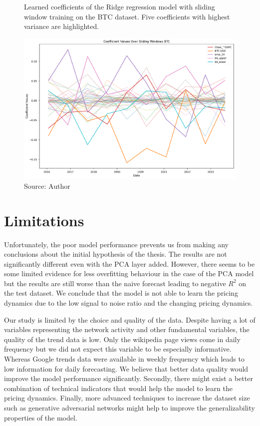 \begin{figure}[!h]
    \centering
    \caption{Learned coefficients of the Ridge regression model
    with sliding window training on the BTC dataset. Five 
    coefficients with highest variance are highlighted.}
    \includegraphics[width=1\textwidth]{Figures/coefficient_values_sliding_btc.pdf}
    \caption*{Source: Author}
    \label{fig:coefs_sliding_btc}
\end{figure}

\section{Limitations}
\label{sec:limitations}
Unfortunately, the poor model performance 
prevents us from making any conclusions about the
initial hypothesis of the thesis. The results 
are not significantly different even with the \ac{PCA}
layer added. However, there seems
to be some limited evidence for less overfitting behaviour 
in the case of the \ac{PCA} model
but the results are still worse than the naive forecast leading to
negative $R^2$ on the test dataset. We conclude
that the model is not able to learn the pricing dynamics
due to the low signal to noise ratio and the changing pricing dynamics.


Our study is limited by the choice and 
quality of the data. Despite having 
a lot of variables representing the network activity and 
other fundamental variables, the quality of the trend data is low.
Only the wikipedia page views come in daily frequency
but we did not expect this variable to be especially informative. 
Whereas Google trends data were available in weekly frequency
which leads to low information for daily forecasting.
We believe that better data quality would improve
the model performance significantly. 
Secondly, there might exist a better combination of technical
indicators that would help the model to learn the pricing dynamics.
Finally, more advanced techniques to increase
the dataset size such as generative adversarial networks 
might help to improve the generalizability properties of the model.

